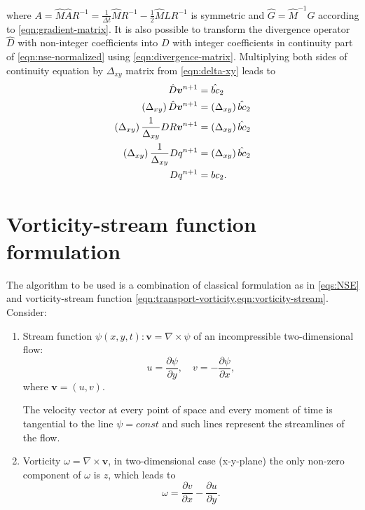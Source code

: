 \documentclass{article}
\numberwithin{equation}{section}
\begin{document}
where $A=\hat{M}\hat{A}R^{-1}=\frac{1}{\Delta t}\hat{M}R^{-1}-\frac{1}{2}\hat{M}\hat{L}R^{-1}$ is symmetric and $\hat{G}=\hat{M}^{-1}G$ according to \cref{eqn:gradient-matrix}. It is also possible to transform the divergence operator $\hat{D}$ with non-integer coefficients into $D$ with integer coefficients in continuity part of \cref{eqn:nse-normalized} using  \cref{eqn:divergence-matrix}. Multiplying both sides of continuity equation by $\Delta _{xy}$ matrix from \cref{eqn:delta-xy} leads to 
\begin{align*}
	\hat{D}\boldsymbol{v}^{n+1}&= \hat{bc}_2\notag\\
	\left(\Delta_{xy} \right)\hat{D}\boldsymbol{v}^{n+1}&=\left ( \Delta_{xy}\right ) \hat{bc}_2\notag\\
	\left(\Delta_{xy}\right)\frac{1}{\Delta _{xy}}{D}R\boldsymbol{v}^{n+1}&=\left ( \Delta_{xy}\right ) \hat{bc}_2\notag\\
	\left(\Delta_{xy}\right)\frac{1}{\Delta_{xy}}{D}q^{n+1}&=\left ( \Delta_{xy}\right ) \hat{bc}_2\notag\\
	D{q}^{n+1}&=bc_2.
\end{align*}


	\section{Vorticity-stream function formulation}\label{sec:vorticity-streamfunction}
	The algorithm to be used is a combination of classical formulation as in \cref{eqs:NSE} and vorticity-stream function \cref{eqn:transport-vorticity,eqn:vorticity-stream}.
	Consider:
	
	\begin{enumerate}
	\item	

	Stream function $\psi(x,y,t):\boldsymbol{v}=\nabla \times \psi$ of an incompressible two-dimensional flow:
	\begin{equation}
	\label{eqn:streamfunction}
		u = \frac{\partial \psi}{\partial y},\quad v=-\frac{\partial \psi}{\partial x},
	\end{equation}
	where $\boldsymbol{v}=(u,v)$.
	
	The velocity vector at every point of space and every moment of time is tangential to the line $\psi = const$ and such lines represent the streamlines of the flow. 
	\item
	
	Vorticity $\omega = \nabla \times \boldsymbol{v}$, in two-dimensional case (x-y-plane) the only non-zero component of $\omega$ is $z$, which leads to
	\begin{equation}
	\label{eqn:vorticity}
		\omega=\frac{\partial v}{\partial x} - \frac{\partial u}{\partial y}.
	\end{equation}
	\end{enumerate}
	
\end{document}
